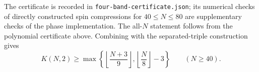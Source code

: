\documentclass[11pt]{article}
\begin{document}
The certificate is recorded in \texttt{four-band-certificate.json}; its
numerical checks of directly constructed spin compressions for
$40\le N\le80$ are supplementary checks of the phase implementation.
The all-$N$ statement follows from the polynomial certificate above.
Combining with the separated-triple construction gives
\[
 K(N,2)\ge\max\!\left\{
 \left\lfloor\frac{N+3}{9}\right\rfloor,
 \left\lfloor\frac N8\right\rfloor-3\right\}\qquad(N\ge40).
\]
\end{document}
